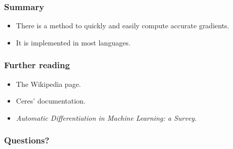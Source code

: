 \documentclass[serif,mathserif]{beamer}
\begin{document}
\begin{frame}
  \frametitle{Summary}
  \begin{itemize}
  \item There is a method to quickly and easily compute accurate gradients. \pause
  \item It is implemented in most languages.
  \end{itemize}
\end{frame}

\begin{frame}
  \frametitle{Further reading}
  \begin{itemize}
  \item The Wikipedia page. \pause
  \item Ceres' documentation. \pause
  \item \emph{Automatic Differentiation in Machine Learning: a Survey}.
  \end{itemize}
\end{frame}

\begin{frame}
  \frametitle{Questions?}
\end{frame}
\end{document}
